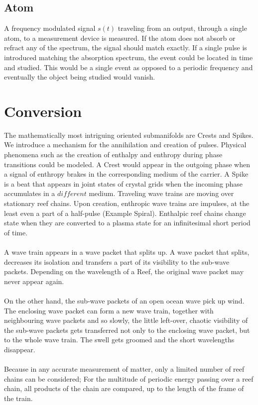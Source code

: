 \documentclass{report}
\begin{document}
\section{Atom}
A frequency modulated signal $s(t)$ traveling from an output, through a single atom, to a measurement device is measured. If the atom does not absorb or refract any of the spectrum, the signal should match exactly. If a single pulse is introduced matching the absorption spectrum, the event could be located in time and studied. This would be a single event as opposed to a periodic frequency and eventually the object being studied would vanish.

\chapter{Conversion}
The mathematically most intriguing oriented submanifolds are Crests and Spikes. We introduce a mechanism for the annihilation and creation of pulses. Physical phenomena such as the creation of enthalpy and enthropy during phase transitions could be modeled. A Crest would appear in the outgoing phase when a signal of enthropy brakes in the corresponding medium of the carrier. A Spike is a beat that appears in joint states of crystal grids when the incoming phase accumulates in a $different$ medium.
Traveling wave trains are moving over stationary reef chains. Upon creation, enthropic wave trains are impulses, at the least even a part of a half-pulse (Example Spiral). Enthalpic reef chains change state when they are converted to a plasma state for an infinitesimal short period of time.\\\\
A wave train appears in a wave packet that splits up. A wave packet that splits, decreases its isolation and transfers a part of its visibility to the sub-wave packets. Depending on the wavelength of a Reef, the original wave packet may never appear again.\\\\
On the other hand, the sub-wave packets of an open ocean wave pick up wind. The enclosing wave packet can form a new wave train, together with neighbouring wave packets and so slowly, the little left-over, chaotic visibility of the sub-wave packets gets transferred not only to the enclosing wave packet, but to the whole wave train. The swell gets groomed and the short wavelengths disappear.\\\\
Because in any accurate measurement of matter, only a limited number of reef chains can be considered; For the multitude of periodic energy passing over a reef chain, all products of the chain are compared, up to the length of the frame of the train.
\end{document}
